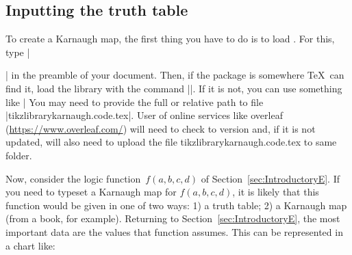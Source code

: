 \documentclass[a4paper]{ltxdoc}
\begin{document}
\subsection{Inputting the truth table\label{sec:Inputting}}

To create a Karnaugh map, the first thing you have to do is to load \tikzname. For this, type |\usepackage{tikz}| in the preamble of your document. Then, if the package is somewhere \TeX\ can find it, load the library with the command |\usetikzlibrary{karnaugh}|. If it is not, you can use something like | You may need to provide the full or relative path to file |tikzlibrarykarnaugh.code.tex|. User of online services like overleaf (\url{https://www.overleaf.com/}) will need to check to version and, if it is not updated, will also need to upload the file tikzlibrarykarnaugh.code.tex to same folder.

Now, consider the logic function~$f(a,b,c,d)$ of Section~\ref{sec:IntroductoryE}. If you need to typeset a Karnaugh map for $f(a,b,c,d)$, it is likely that this function would be given in one of two ways: 1) a truth table; 2) a Karnaugh map (from a book, for example). Returning to Section~\ref{sec:IntroductoryE}, the most important data are the values that function assumes. This can be represented in a chart like:

\begin{center}
\end{center}
\end{document}
